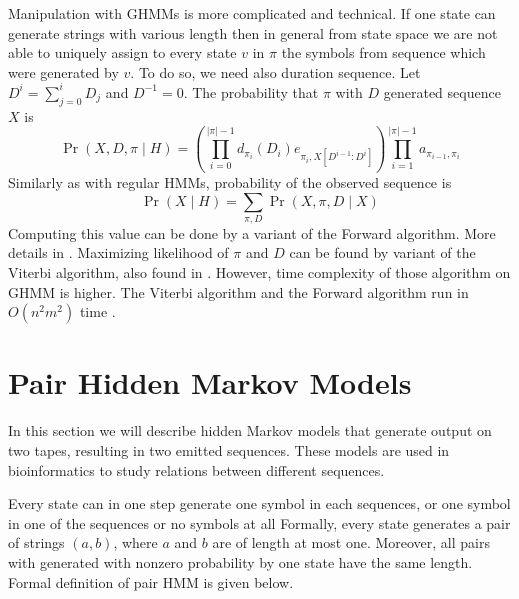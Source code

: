 Manipulation with GHMMs is  more complicated and technical. If one state can
generate strings with various length then in general from state space we are
not able to uniquely assign to every state $v$ in $\pi$ the symbols from
sequence which were generated by $v$. To do so, we need also duration sequence.
Let $D^i = \sum_{j=0}^{i}D_j$ and $D^{-1}=0$.
The probability that $\pi$ with $D$ generated sequence $X$ is
\begin{equation}
\Pr(X,D,\pi\mid H) = 
\left(
\prod_{i=0}^{|\pi|-1}
d_{\pi_i}(D_i)e_{\pi_i,X[D^{i-1}:D^i]}
\right)
\prod_{i=1}^{|\pi|-1}
a_{\pi_{i-1},\pi_i}
\end{equation}
Similarly as with regular HMMs,  probability of the observed
sequence is
\begin{equation}
\Pr\left(X\mid H\right) = \sum_{\pi,D}\Pr\left(X,\pi,D\mid X\right)
\end{equation}
Computing this value can be done by a variant of the Forward algorithm. More
details 
in \cite{}. Maximizing likelihood of $\pi$ and $D$ can be found by variant of
the Viterbi algorithm, also found in \cite{}. However, time complexity of those
algorithm on GHMM is higher. The Viterbi algorithm and the Forward algorithm
run in $O(n^2m^2)$ time \cite{}.

\section{Pair Hidden Markov Models}
In this section we will describe hidden Markov models that generate output on
two tapes, resulting in two emitted sequences. These models are used in
bioinformatics to study relations between different sequences.


Every state can in one step generate one symbol in each sequences, or one symbol
in one of the sequences or no symbols at all
Formally, every state generates a pair of strings $(a,b)$, where $a$
and $b$ are of length at most one.
Moreover, all pairs with generated with nonzero probability by one state have
the same length.  Formal definition of pair HMM is given below.

